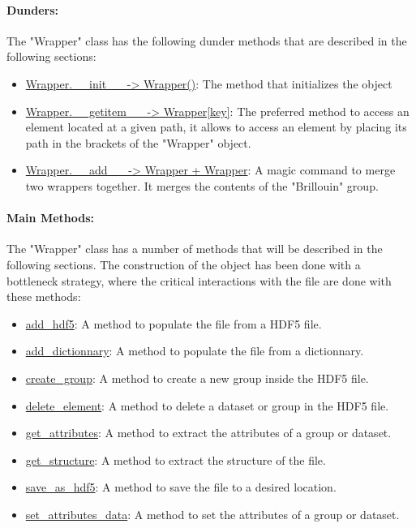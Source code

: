 \paragraph{Dunders:} 
The "Wrapper" class has the following dunder methods that are described in the following sections:
\begin{itemize}
    \item \hyperref[subsec:wrapper.__init__]{Wrapper.\_\_init\_\_ -> Wrapper()}: The method that initializes the object
    \item \hyperref[subsec:wrapper.__getitem__]{Wrapper.\_\_getitem\_\_ -> Wrapper[key]}: The preferred method to access an element located at a given path, it allows to access an element by placing its path in the brackets of the "Wrapper" object.
    \item \hyperref[subsec:wrapper.__add__]{Wrapper.\_\_add\_\_ -> Wrapper + Wrapper}: A magic command to merge two wrappers together. It merges the contents of the "Brillouin" group.
\end{itemize}

\paragraph{Main Methods:} 
The "Wrapper" class has a number of methods that will be described in the following sections. The construction of the object has been done with a bottleneck strategy, where the critical interactions with the file are done with these methods:
\begin{itemize}
    \item \hyperref[subsec:wrapper.add_hdf5]{add\_hdf5}: A method to populate the file from a HDF5 file.
    \item \hyperref[subsec:wrapper.add_dictionnary]{add\_dictionnary}: A method to populate the file from a dictionnary.
    \item \hyperref[subsec:wrapper.create_group]{create\_group}: A method to create a new group inside the HDF5 file.
    \item \hyperref[subsec:wrapper.delete_element]{delete\_element}: A method to delete a dataset or group in the HDF5 file.
    \item \hyperref[subsec:wrapper.get_attributes]{get\_attributes}: A method to extract the attributes of a group or dataset.
    \item \hyperref[subsec:wrapper.get_structure]{get\_structure}: A method to extract the structure of the file.
    \item \hyperref[subsec:wrapper.save_as_hdf5]{save\_as\_hdf5}: A method to save the file to a desired location.
    \item \hyperref[subsec:wrapper.set_attributes_data]{set\_attributes\_data}: A method to set the attributes of a group or dataset.
\end{itemize}

